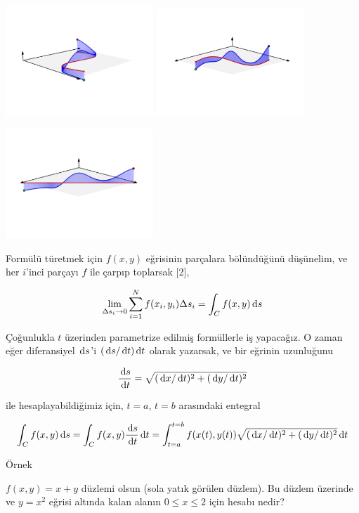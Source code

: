 \documentclass[12pt,fleqn]{article}\usepackage{../../common}
\begin{document}
\includegraphics[width=15em]{19_line_ex1_05.png}
\includegraphics[width=15em]{19_line_ex1_06.png}

\includegraphics[width=15em]{19_line_ex1_07.png}

Formülü türetmek için $f(x,y)$ eğrisinin parçalara bölündüğünü düşünelim,
ve her $i$'inci parçayı $f$ ile çarpıp toplarsak [2], 

$$
\lim_{\Delta s_i \to 0} \sum _{i=1}^{N} f(x_i,y_i) \Delta s_i = \int_C f(x,y) 
\,\mathrm{d} s
$$

Çoğunlukla $t$ üzerinden parametrize edilmiş formüllerle iş yapacağız. O
zaman eğer diferansiyel $\,\mathrm{d} s$'i $(\,\mathrm{d} s/ \,\mathrm{d} t) \,\mathrm{d} t$ olarak yazarsak,
ve bir eğrinin uzunluğunu

$$
\frac{\,\mathrm{d} s}{\,\mathrm{d} t} = \sqrt{(\,\mathrm{d} x/\,\mathrm{d} t)^2 + (\,\mathrm{d} y/\,\mathrm{d} t)^2} 
$$
 
ile hesaplayabildiğimiz için, $t=a$, $t=b$ arasındaki entegral

$$
\int_C f(x,y) \,\mathrm{d} s = 
\int_C f(x,y) \frac{\,\mathrm{d} s}{\,\mathrm{d} t} \,\mathrm{d} t = 
\int_{t=a}^{t=b} f(x(t),y(t)) \sqrt{(\,\mathrm{d} x/\,\mathrm{d} t)^2 + (\,\mathrm{d} y/\,\mathrm{d} t)^2} \,\mathrm{d} t
$$


Örnek

$f(x,y) = x + y$ düzlemi olsun (sola yatık görülen düzlem). Bu düzlem
üzerinde ve $y = x^2$ eğrisi altında kalan alanın $0 \le x \le 2$ için
hesabı nedir?
\end{document}
